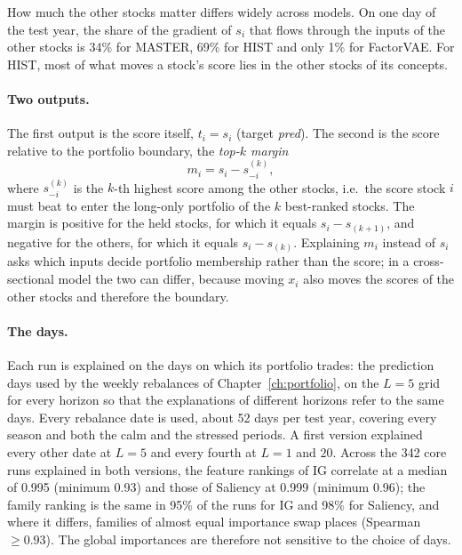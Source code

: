 How much the other stocks matter differs widely across models. On one day of the test year, the share of the gradient of $s_i$ that flows through the inputs of the other stocks is 34\% for MASTER, 69\% for HIST and only 1\% for FactorVAE. %
For HIST, most of what moves a stock's score lies in the other stocks of its concepts.

\paragraph{Two outputs.} The first output is the score itself, $t_i = s_i$ (target \emph{pred}). The second is the score relative to the portfolio boundary, the \emph{top-$k$ margin}
\begin{equation}
    \label{eq:xm_margin}
    m_i = s_i - s^{(k)}_{-i},
\end{equation}
where $s^{(k)}_{-i}$ is the $k$-th highest score among the other stocks, i.e.\ the score stock $i$ must beat to enter the long-only portfolio of the $k$ best-ranked stocks. The margin is positive for the held stocks, for which it equals $s_i - s_{(k+1)}$, and negative for the others, for which it equals $s_i - s_{(k)}$. Explaining $m_i$ instead of $s_i$ asks which inputs decide portfolio membership rather than the score; in a cross-sectional model the two can differ, because moving $x_i$ also moves the scores of the other stocks and therefore the boundary.

\paragraph{The days.} Each run is explained on the days on which its portfolio trades: the prediction days used by the weekly rebalances of Chapter~\ref{ch:portfolio}, on the $L = 5$ grid for every horizon so that the explanations of different horizons refer to the same days. Every rebalance date is used, about 52 days per test year, covering every season and both the calm and the stressed periods. A first version explained every other date at $L = 5$ and every fourth at $L = 1$ and $20$. Across the 342 core runs explained in both versions, the feature rankings of IG correlate at a median of 0.995 (minimum 0.93) and those of Saliency at 0.999 (minimum 0.96); the family ranking is the same in 95\% of the runs for IG and 98\% for Saliency, and where it differs, families of almost equal importance swap places (Spearman $\geq 0.93$). The global importances are therefore not sensitive to the choice of days. %

